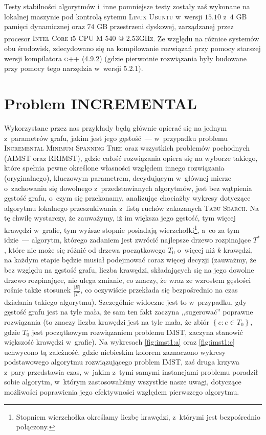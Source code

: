 Testy stabilności algorytmów i~inne pomniejsze testy zostały zaś wykonane na lokalnej maszynie pod kontrolą sytemu \textsc{Linux Ubuntu} w~wersji $15.10$ z~$4$ \textsc{GB} pamięci dynamicznej oraz $74$ \textsc{GB} przestrzeni dyskowej, zarządzanej przez procesor \textsc{Intel\textsuperscript{\textregistered} Core\textsuperscript{\texttrademark} i5 CPU M 540 @ 2.53GHz}.
Ze względu na różnice systemów obu środowisk, zdecydowano się na kompilowanie rozwiązań przy pomocy starszej wersji kompilatora \textsc{g++} (\textsc{4.9.2}) (gdzie pierwotnie rozwiązania były budowane przy pomocy tego narzędzia w~wersji \textsc{5.2.1}).




\section{Problem INCREMENTAL}




Wykorzystane przez nas przykłady będą głównie opierać się na jednym z~parametrów grafu, jakim jest jego gęstość~--- w~przypadku problemu \textsc{Incremental Minimum Spanning Tree} oraz wszystkich problemów pochodnych (\textsc{AIMST} oraz \textsc{RRIMST}), gdzie całość rozwiązania opiera się na wyborze takiego, które spełnia pewne określone własności względem innego rozwiązania (oryginalnego), kluczowym parametrem, decydującym w~głównej mierze o~zachowaniu się dowolnego z~przedstawianych algorytmów, jest bez wątpienia gęstość grafu, o~czym się przekonamy, analizując chociażby wykresy dotyczące algorytmu lokalnego przeszukiwania z~listą ruchów zakazanych \textsc{Tabu Search}.
Na tę chwilę wystarczy, że zauważymy, iż im większa jego gęstość, tym więcej krawędzi w~grafie, tym wyższe stopnie posiadają wierzchołki\footnote{
	Stopniem wierzchołka określamy liczbę krawędzi, z~którymi jest bezpośrednio połączony.
}, a~co za tym idzie~--- algorytm, którego zadaniem jest zwrócić najlepsze drzewo rozpinające $T^{\ast}$, które nie może się różnić od drzewa początkowego $T_{0}$ o~więcej niż $k$ krawędzi, na każdym etapie będzie musiał podejmować coraz więcej decyzji (zauważmy, że bez względu na gęstość grafu, liczba krawędzi, składających się na jego dowolne drzewo rozpinające, nie ulega zmianie, co znaczy, że wraz ze wzrostem gęstości rośnie także stosunek $\frac{\left| E \right|}{\left| T \right|}$, co oczywiście przekłada się bezpośrednio na czas działania takiego algorytmu).
Szczególnie widoczne jest to w~przypadku, gdy gęstość grafu jest na tyle mała, że sam ten fakt zaczyna ,,sugerować'' poprawne rozwiązania (to znaczy liczba krawędzi jest na tyle mała, że zbiór $\left\{ e : e \in T_{0} \right\}$, gdzie $T_{0}$ jest początkowym rozwiązaniem problemu \textsc{IMST}, zaczyna stanowić większość krawędzi w~grafie).
Na wykresach \ref{fig:imst1:a} oraz \ref{fig:imst1:c} uchwycono tą zależność, gdzie niebieskim kolorem zaznaczono wykresy podstawowego algorytmu rozwiązującego problem \textsc{IMST}, zaś druga krzywa z~pary przedstawia czas, w~jakim z~tymi samymi instancjami problemu poradził sobie algorytm, w~którym zastosowaliśmy wszystkie nasze uwagi, dotyczące możliwości poprawienia jego efektywności względem pierwszego algorytmu.

